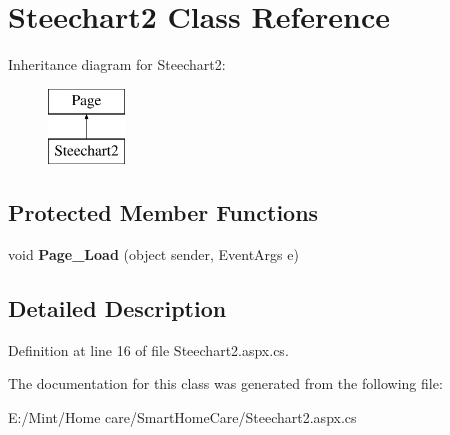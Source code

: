 \hypertarget{class_steechart2}{\section{Steechart2 Class Reference}
\label{class_steechart2}
}
Inheritance diagram for Steechart2\-:\begin{figure}[H]
\begin{center}
\leavevmode
\includegraphics[height=2.000000cm]{class_steechart2}
\end{center}
\end{figure}
\subsection*{Protected Member Functions}
\begin{DoxyCompactItemize}
\item 
\hypertarget{class_steechart2_afc5fbe8a9b611e83c258c31cff4f699d}{void {\bfseries Page\-\_\-\-Load} (object sender, Event\-Args e)}\label{class_steechart2_afc5fbe8a9b611e83c258c31cff4f699d}

\end{DoxyCompactItemize}


\subsection{Detailed Description}


Definition at line 16 of file Steechart2.\-aspx.\-cs.



The documentation for this class was generated from the following file\-:\begin{DoxyCompactItemize}
\item 
E\-:/\-Mint/\-Home care/\-Smart\-Home\-Care/Steechart2.\-aspx.\-cs\end{DoxyCompactItemize}
